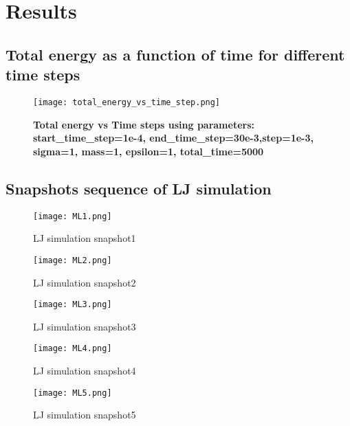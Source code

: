 \chapter{Results}\label{chap:results}

\section{Total energy as a function of time for different time steps}
    \graphicspath{ {./figures/milestone04/} }
    \begin{figure}[!htb]
    \centering
        \texttt{[image: total\_energy\_vs\_time\_step.png]}
        \caption[Total energy vs Time steps using parameters]{\textbf{Total energy vs Time steps using parameters: start\_time\_step=1e-4, end\_time\_step=30e-3,step=1e-3, sigma=1, mass=1, epsilon=1, total\_time=5000}}
    \label{fig:total_energy_vs_time_step}
    \end{figure}


\section{Snapshots sequence of LJ simulation}
    \graphicspath{ {./figures/milestone04/} }
    \begin{figure}[h]

    \centering
        \texttt{[image: ML1.png]}
        \caption{LJ simulation snapshot1}
    \label{fig:step1}
    \end{figure}
    \begin{figure}[!htb]
    \centering
        \texttt{[image: ML2.png]}
        \caption{LJ simulation snapshot2}
    \label{fig:step2}
    \end{figure}
    \begin{figure}[!htb]
    \centering
        \texttt{[image: ML3.png]}
        \caption{LJ simulation snapshot3}
    \label{fig:step3}
    \end{figure}
    \begin{figure}[!htb]
    \centering
        \texttt{[image: ML4.png]}
        \caption{LJ simulation snapshot4}
    \label{fig:step4}
    \end{figure}
    \begin{figure}[!htb]
    \centering
        \texttt{[image: ML5.png]}
        \caption{LJ simulation snapshot5}
    \label{fig:step5}
    \end{figure}



